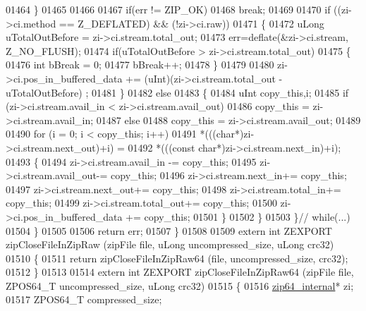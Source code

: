 \begin{DoxyCode}
01464           \}
01465 
01466 
01467           \textcolor{keywordflow}{if}(err != ZIP\_OK)
01468               \textcolor{keywordflow}{break};
01469 
01470           \textcolor{keywordflow}{if} ((zi->ci.method == Z\_DEFLATED) && (!zi->ci.raw))
01471           \{
01472               uLong uTotalOutBefore = zi->ci.stream.total\_out;
01473               err=deflate(&zi->ci.stream,  Z\_NO\_FLUSH);
01474               \textcolor{keywordflow}{if}(uTotalOutBefore > zi->ci.stream.total\_out)
01475               \{
01476                 \textcolor{keywordtype}{int} bBreak = 0;
01477                 bBreak++;
01478               \}
01479 
01480               zi->ci.pos\_in\_buffered\_data += (uInt)(zi->ci.stream.total\_out - uTotalOutBefore) ;
01481           \}
01482           \textcolor{keywordflow}{else}
01483           \{
01484               uInt copy\_this,i;
01485               \textcolor{keywordflow}{if} (zi->ci.stream.avail\_in < zi->ci.stream.avail\_out)
01486                   copy\_this = zi->ci.stream.avail\_in;
01487               \textcolor{keywordflow}{else}
01488                   copy\_this = zi->ci.stream.avail\_out;
01489 
01490               \textcolor{keywordflow}{for} (i = 0; i < copy\_this; i++)
01491                   *(((\textcolor{keywordtype}{char}*)zi->ci.stream.next\_out)+i) =
01492                       *(((\textcolor{keyword}{const} \textcolor{keywordtype}{char}*)zi->ci.stream.next\_in)+i);
01493               \{
01494                   zi->ci.stream.avail\_in -= copy\_this;
01495                   zi->ci.stream.avail\_out-= copy\_this;
01496                   zi->ci.stream.next\_in+= copy\_this;
01497                   zi->ci.stream.next\_out+= copy\_this;
01498                   zi->ci.stream.total\_in+= copy\_this;
01499                   zi->ci.stream.total\_out+= copy\_this;
01500                   zi->ci.pos\_in\_buffered\_data += copy\_this;
01501               \}
01502           \}
01503       \}\textcolor{comment}{// while(...)}
01504     \}
01505 
01506     \textcolor{keywordflow}{return} err;
01507 \}
01508 
01509 \textcolor{keyword}{extern} \textcolor{keywordtype}{int} ZEXPORT zipCloseFileInZipRaw (zipFile file, uLong uncompressed\_size, uLong crc32)
01510 \{
01511     \textcolor{keywordflow}{return} zipCloseFileInZipRaw64 (file, uncompressed\_size, crc32);
01512 \}
01513 
01514 \textcolor{keyword}{extern} \textcolor{keywordtype}{int} ZEXPORT zipCloseFileInZipRaw64 (zipFile file, ZPOS64\_T uncompressed\_size, uLong crc32)
01515 \{
01516     \hyperlink{structzip64__internal}{zip64\_internal}* zi;
01517     ZPOS64\_T compressed\_size;

\end{DoxyCode}

